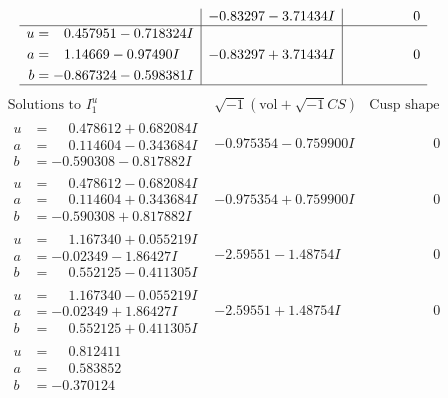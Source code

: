 \documentclass[1p]{elsarticle_modified}
\theoremstyle{definition}
\newcommand{\I}{\sqrt{-1}}
\begin{document}
$$\begin{array}{c|c|c}
 & -0.83297 - 3.71434 I & \phantom{-0.000000 } 0 \\ \hline\begin{aligned}
u &= \phantom{-}0.457951 - 0.718324 I \\
a &= \phantom{-}1.14669 - 0.97490 I \\
b &= -0.867324 - 0.598381 I\end{aligned}
 & -0.83297 + 3.71434 I & \phantom{-0.000000 } 0\\
 \hline 
 \end{array}$$\newpage$$\begin{array}{c|c|c}  
\text{Solutions to }I^u_{1}& \I (\text{vol} + \sqrt{-1}CS) & \text{Cusp shape}\\
 \hline 
\begin{aligned}
u &= \phantom{-}0.478612 + 0.682084 I \\
a &= \phantom{-}0.114604 - 0.343684 I \\
b &= -0.590308 - 0.817882 I\end{aligned}
 & -0.975354 - 0.759900 I & \phantom{-0.000000 } 0 \\ \hline\begin{aligned}
u &= \phantom{-}0.478612 - 0.682084 I \\
a &= \phantom{-}0.114604 + 0.343684 I \\
b &= -0.590308 + 0.817882 I\end{aligned}
 & -0.975354 + 0.759900 I & \phantom{-0.000000 } 0 \\ \hline\begin{aligned}
u &= \phantom{-}1.167340 + 0.055219 I \\
a &= -0.02349 - 1.86427 I \\
b &= \phantom{-}0.552125 - 0.411305 I\end{aligned}
 & -2.59551 - 1.48754 I & \phantom{-0.000000 } 0 \\ \hline\begin{aligned}
u &= \phantom{-}1.167340 - 0.055219 I \\
a &= -0.02349 + 1.86427 I \\
b &= \phantom{-}0.552125 + 0.411305 I\end{aligned}
 & -2.59551 + 1.48754 I & \phantom{-0.000000 } 0 \\ \hline\begin{aligned}
u &= \phantom{-}0.812411\phantom{ +0.000000I} \\
a &= \phantom{-}0.583852\phantom{ +0.000000I} \\
b &= -0.370124\phantom{ +0.000000I}\end{aligned}

\end{array}$$
\end{document}
